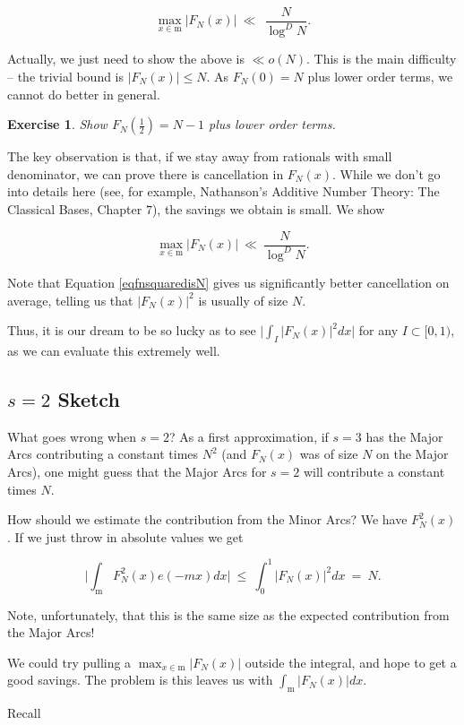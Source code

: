 \documentclass[12pt,letterpaper]{report}
\newcommand\be{\begin{equation}}
\newcommand\ee{\end{equation}}
\newcommand{\foh}{\frac{1}{2}}  %
\newtheorem{exe}[thm]{Exercise}
\begin{document}
\be \max_{x \in \mathrm{m}} |F_N(x)| \ \ll \ \ \frac{N}{\log^D N}.
\ee

Actually, we just need to show the above is $\ll o(N)$. This is
the main difficulty -- the trivial bound is $|F_N(x)| \le N$. As
$F_N(0) = N$ plus lower order terms, we cannot do better in
general.

\begin{exe} Show $F_N(\foh) = N-1$ plus lower order terms.
\end{exe}

The key observation is that, if we stay away from rationals with
small denominator, we can prove there is cancellation in $F_N(x)$.
While we don't go into details here (see, for example, Nathanson's
Additive Number Theory: The Classical Bases, Chapter $7$), the
savings we obtain is small. We show

\be \max_{x \in \mathrm{m} } |F_N(x)| \ \ll \ \frac{N}{\log^D N}.
\ee

Note that Equation \ref{eqfnsquaredisN} gives us significantly
better cancellation on average, telling us that $|F_N(x)|^2$ is
usually of size $N$.

Thus, it is our dream to be so lucky as to see $\Big| \int_I
|F_N(x)|^2 dx \Big|$ for any $I \subset [0,1)$, as we can evaluate
this extremely well.

\subsection{$s = 2$ Sketch}

What goes wrong when $s = 2$? As a first approximation, if $s = 3$
has the Major Arcs contributing a constant times $N^2$ (and
$F_N(x)$ was of size $N$ on the Major Arcs), one might guess that
the Major Arcs for $s = 2$ will contribute a constant times $N$.

How should we estimate the contribution from the Minor Arcs? We
have $F_N^2(x)$. If we just throw in absolute values we get

\be \Big|\int_{\mathrm{m}} F_N^2(x)e(-mx)dx \Big| \ \le \ \int_0^1
|F_N(x)|^2dx \ = \ N. \ee

Note, unfortunately, that this is the same size as the expected
contribution from the Major Arcs!

We could try pulling a $\max_{x \in \mathrm{m}} |F_N(x)|$ outside
the integral, and hope to get a good savings. The problem is this
leaves us with $\int_{\mathrm{m}} |F_N(x)|dx$.

Recall
\end{document}
